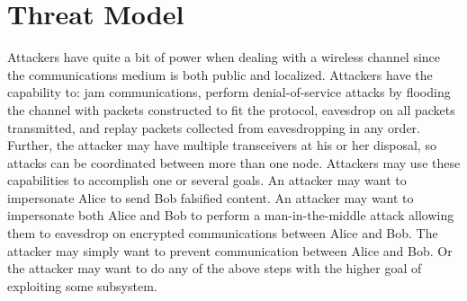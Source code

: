 \documentclass[12pt]{report}
\begin{document}
\section{Threat Model}
Attackers have quite a bit of power when dealing with a wireless channel since the communications medium is both public and localized. Attackers have the capability to: jam communications, perform denial-of-service attacks by flooding the channel with packets constructed to fit the protocol, eavesdrop on all packets transmitted, and replay packets collected from eavesdropping in any order. Further, the attacker may have multiple transceivers at his or her disposal, so attacks can be coordinated between more than one node.
Attackers may use these capabilities to accomplish one or several goals. An attacker may want to impersonate Alice to send Bob falsified content. An attacker may want to impersonate both Alice and Bob to perform a man-in-the-middle attack allowing them to eavesdrop on encrypted communications between Alice and Bob. The attacker may simply want to prevent communication between Alice and Bob. Or the attacker may want to do any of the above steps with the higher goal of exploiting some subsystem.
\end{document}
